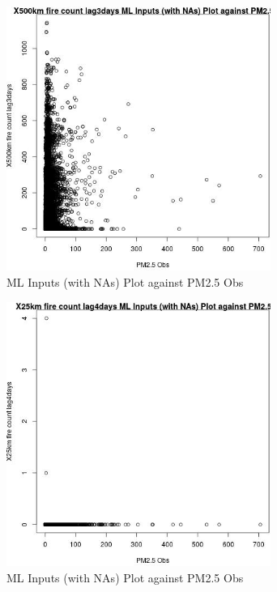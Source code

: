\begin{figure} 
\centering  
\includegraphics[width=0.77\textwidth]{Code_Outputs/Report_ML_input_PM25_Step4_part_e_de_duplicated_aves_compiled_2019-05-14wNAs_X500km_fire_count_lag3daysvPM25_Obs.jpg} 
\caption{\label{fig:Report_ML_input_PM25_Step4_part_e_de_duplicated_aves_compiled_2019-05-14wNAsX500km_fire_count_lag3daysvPM25_Obs}ML Inputs (with NAs) Plot against PM2.5 Obs} 
\end{figure} 
 

\begin{figure} 
\centering  
\includegraphics[width=0.77\textwidth]{Code_Outputs/Report_ML_input_PM25_Step4_part_e_de_duplicated_aves_compiled_2019-05-14wNAs_X25km_fire_count_lag4daysvPM25_Obs.jpg} 
\caption{\label{fig:Report_ML_input_PM25_Step4_part_e_de_duplicated_aves_compiled_2019-05-14wNAsX25km_fire_count_lag4daysvPM25_Obs}ML Inputs (with NAs) Plot against PM2.5 Obs} 
\end{figure} 
 

